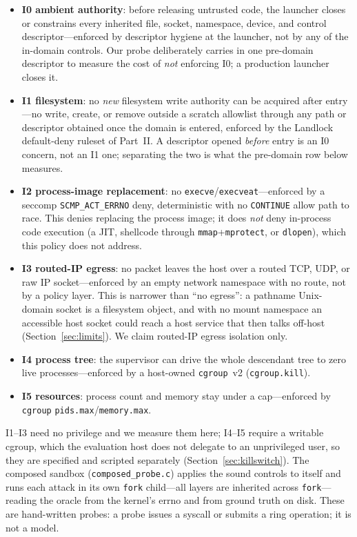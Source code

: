 \documentclass[11pt]{article}
\begin{document}
\begin{itemize}[leftmargin=1.4em,itemsep=1pt]
\item \textbf{I0 ambient authority}: before releasing untrusted code, the launcher closes or constrains
every inherited file, socket, namespace, device, and control descriptor---enforced by descriptor hygiene
at the launcher, not by any of the in-domain controls. Our probe deliberately carries in one pre-domain
descriptor to measure the cost of \emph{not} enforcing I0; a production launcher closes it.
\item \textbf{I1 filesystem}: no \emph{new} filesystem write authority can be acquired after entry---no
write, create, or remove outside a scratch allowlist through any path or descriptor obtained once the
domain is entered, enforced by the Landlock default-deny ruleset of Part~II. A descriptor opened
\emph{before} entry is an I0 concern, not an I1 one; separating the two is what the pre-domain row below
measures.
\item \textbf{I2 process-image replacement}: no \texttt{execve}/\texttt{execveat}---enforced by a seccomp
\texttt{SCMP\_ACT\_ERRNO} deny, deterministic with no \texttt{CONTINUE} allow path to race. This denies
replacing the process image; it does \emph{not} deny in-process code execution (a JIT, shellcode through
\texttt{mmap}+\texttt{mprotect}, or \texttt{dlopen}), which this policy does not address.
\item \textbf{I3 routed-IP egress}: no packet leaves the host over a routed TCP, UDP, or raw IP
socket---enforced by an empty network namespace with no route, not by a policy layer. This is narrower
than ``no egress'': a pathname Unix-domain socket is a filesystem object, and with no mount namespace an
accessible host socket could reach a host service that then talks off-host (Section~\ref{sec:limits}). We
claim routed-IP egress isolation only.
\item \textbf{I4 process tree}: the supervisor can drive the whole descendant tree to zero live
processes---enforced by a host-owned \texttt{cgroup}~v2 (\texttt{cgroup.kill}).
\item \textbf{I5 resources}: process count and memory stay under a cap---enforced by \texttt{cgroup}
\texttt{pids.max}/\texttt{memory.max}.
\end{itemize}

I1--I3 need no privilege and we measure them here; I4--I5 require a writable cgroup, which the evaluation
host does not delegate to an unprivileged user, so they are specified and scripted separately
(Section~\ref{sec:killswitch}). The composed sandbox (\texttt{composed\_probe.c}) applies the sound
controls to itself and runs each attack in its own \texttt{fork} child---all layers are inherited across
\texttt{fork}---reading the oracle from the kernel's errno and from ground truth on disk. These are
hand-written probes: a probe issues a syscall or submits a ring operation; it is not a model.
\end{document}
